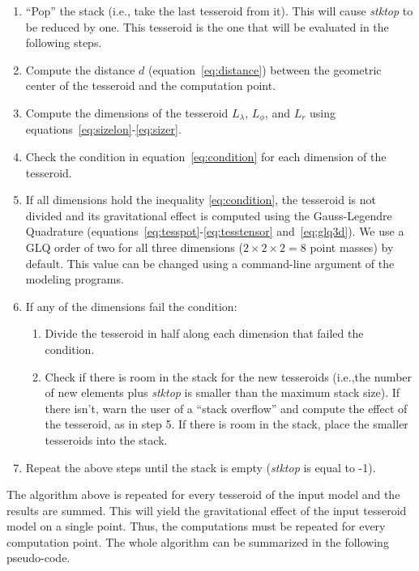 \documentclass[manuscript,endfloat]{geophysics}
\begin{document}
\begin{enumerate}
    \item ``Pop'' the stack (i.e., take the last tesseroid from it).
        This will cause \emph{stktop} to be reduced by one.
        This tesseroid is the one that will be evaluated in the following
        steps.
    \item Compute the distance $d$ (equation~\ref{eq:distance}) between
        the geometric center of the tesseroid and
        the computation point.
    \item Compute the dimensions of the tesseroid $L_\lambda$, $L_\phi$,
        and $L_r$ using equations~\ref{eq:sizelon}-\ref{eq:sizer}.
    \item Check the condition in equation~\ref{eq:condition} for each
        dimension of the tesseroid.
    \item If all dimensions hold the inequality \ref{eq:condition},
        the tesseroid is not divided and its
        gravitational effect is computed using the
        Gauss-Legendre Quadrature
        (equations~\ref{eq:tesspot}-\ref{eq:tesstensor} and~\ref{eq:glq3d}).
        We use a GLQ order of two for all three dimensions
        ($2 \times 2 \times 2 = 8$ point masses)
        by default.
        This value can be changed using
        a command-line argument of the modeling programs.
    \item If any of the dimensions fail the condition:
    \begin{enumerate}
        \item Divide the tesseroid in half along each dimension that failed
             the condition.
        \item Check if there is room in the stack
            for the new tesseroids
            (i.e.,the number of new elements plus \emph{stktop}
             is smaller than the maximum stack size).
             If there isn't,
             warn the user of a ``stack overflow''
             and compute the effect of the tesseroid, as in step 5.
             If there is room in the stack,
             place the smaller tesseroids into
             the stack.
    \end{enumerate}
    \item Repeat the above steps until the stack is empty
        (\emph{stktop} is equal to -1).
\end{enumerate}

The algorithm above is repeated
for every tesseroid of the input model
and the results are summed.
This will yield the gravitational effect
of the input tesseroid model on a single point.
Thus, the computations must be repeated
for every computation point.
The whole algorithm can be summarized
in the following pseudo-code.
\end{document}

